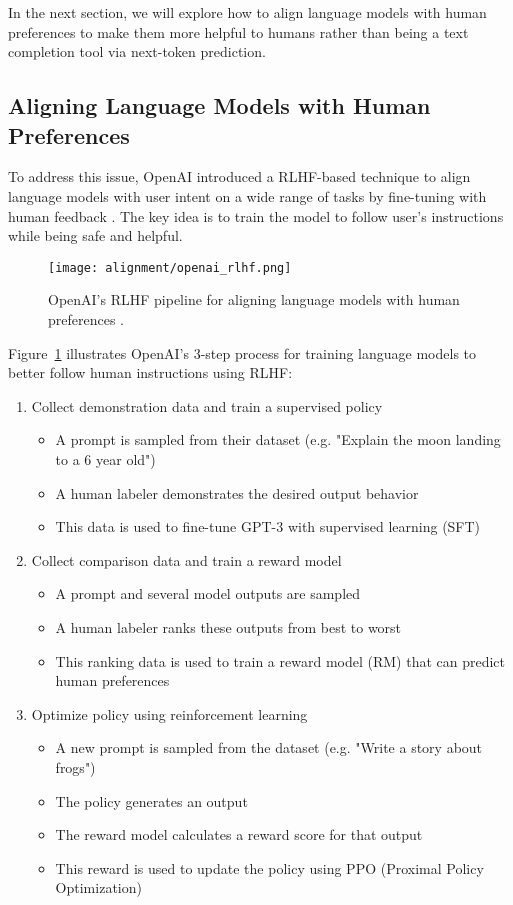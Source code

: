 In the next section, we will explore how to align language models with human preferences to make them more helpful to humans rather than being a text completion tool via next-token prediction.


\subsection{Aligning Language Models with Human Preferences}

To address this issue, OpenAI introduced a RLHF-based technique to align language models with user intent on a wide range of tasks by fine-tuning with human feedback . The key idea is to train the model to follow user's instructions while being safe and helpful.

\begin{figure}[H]
\centering
\texttt{[image: alignment/openai\_rlhf.png]}
\caption{OpenAI's RLHF pipeline for aligning language models with human preferences \cite{ouyang2022traininglanguagemodelsfollow}.}
\label{fig:openai-rlhf}
\end{figure}

Figure~\ref{fig:openai-rlhf} illustrates OpenAI's 3-step process for training language models to better follow human instructions using RLHF:

\begin{enumerate}
\item Collect demonstration data and train a supervised policy
\begin{itemize}
\item A prompt is sampled from their dataset (e.g. "Explain the moon landing to a 6 year old")
\item A human labeler demonstrates the desired output behavior
\item This data is used to fine-tune GPT-3 with supervised learning (SFT)
\end{itemize}

\item Collect comparison data and train a reward model
\begin{itemize}
\item A prompt and several model outputs are sampled
\item A human labeler ranks these outputs from best to worst
\item This ranking data is used to train a reward model (RM) that can predict human preferences
\end{itemize}

\item Optimize policy using reinforcement learning
\begin{itemize}
\item A new prompt is sampled from the dataset (e.g. "Write a story about frogs")
\item The policy generates an output 
\item The reward model calculates a reward score for that output
\item This reward is used to update the policy using PPO (Proximal Policy Optimization)
\end{itemize}
\end{enumerate}

